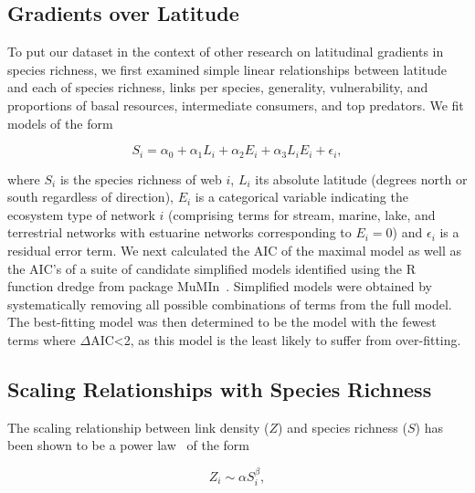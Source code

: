 \documentclass[12pt]{article}
\begin{document}
  \subsection*{Gradients over Latitude}

    To put our dataset in the context of other research on latitudinal gradients in species richness,
    we first examined simple linear relationships between latitude and each of 
    species richness, links per species, generality, vulnerability, and proportions
    of basal resources, intermediate consumers, and top predators. We fit models of the form

    \begin{equation}
    \label{Latfull}
    S_{i} = \alpha_{0} + \alpha_{1} L_{i} + \alpha_{2} E_{i} + \alpha_{3} L_{i} E_{i} + \epsilon_{i} ,
    \end{equation}

    \noindent where $S_{i}$ is the species richness of web $i$, $L_{i}$ its absolute
    latitude (degrees north or south  regardless of direction), $E_{i}$ is a categorical
    variable indicating the ecosystem type of network $i$ (comprising terms for stream, 
    marine, lake, and terrestrial networks with estuarine
    networks corresponding to $E_{i}=0$) and $\epsilon_{i}$ is a residual error term. 
    We next calculated the AIC
    of the maximal model as well as the AIC's of a suite of candidate simplified models identified
    using the R~\cite{R} function dredge from package MuMIn~\cite{MuMIn}. 
    Simplified models were obtained by
    systematically removing all possible combinations of terms from the full model.
    The best-fitting model was then determined to be the model with the fewest terms 
    where $\Delta$AIC\textless2, as this model is the least likely to suffer from over-fitting. 
    


  \subsection*{Scaling Relationships with Species Richness}

    The scaling relationship between link density ($Z$) and species richness ($S$)
    has been shown to be a power law~\cite{Riede2010} of the form 

    \begin{equation}
    \label{Power}
    Z_{i} \sim \alpha S_{i}^{\beta}  ,
    \end{equation}
\end{document}
